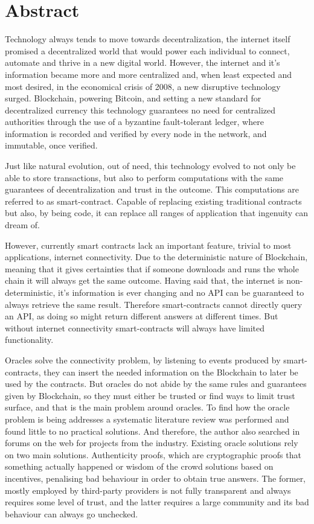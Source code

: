 \chapter*{Abstract}


Technology always tends to move towards decentralization, the internet itself promised a decentralized world that would power each individual to connect, automate and thrive in a new digital world. However, the internet and it's information became more and more centralized and, when least expected and most desired, in the economical crisis of 2008, a new disruptive technology surged. Blockchain, powering Bitcoin, and setting a new standard for decentralized currency this technology guarantees no need for centralized authorities through the use of a byzantine fault-tolerant ledger, where information is recorded and verified by every node in the network, and immutable, once verified.

Just like natural evolution, out of need, this technology evolved to not only be able to store transactions, but also to perform computations with the same guarantees of decentralization and trust in the outcome. This computations are referred to as smart-contract. Capable of replacing existing traditional contracts but also, by being code, it can replace all ranges of application that ingenuity can dream of.

However, currently smart contracts lack an important feature, trivial to most applications, internet connectivity. Due to the deterministic nature of Blockchain, meaning that it gives certainties that if someone downloads and runs the whole chain it will always get the same outcome. Having said that, the internet is non-deterministic, it's information is ever changing and no API can be guaranteed to always retrieve the same result. Therefore smart-contracts cannot directly query an API, as doing so might return different answers at different times. But without internet connectivity smart-contracts will always have limited functionality.

Oracles solve the connectivity problem, by listening to events produced by smart-contracts, they can insert the needed information on the Blockchain to later be used by the contracts. But oracles do not abide by the same rules and guarantees given by Blockchain, so they must either be trusted or find ways to limit trust surface, and that is the main problem around oracles. To find how the oracle problem is being addresses a systematic literature review was performed and found little to no practical solutions. And therefore, the author also searched in forums on the web for projects from the industry. Existing oracle solutions rely on two main solutions. Authenticity proofs, which are cryptographic proofs that something actually happened or wisdom of the crowd solutions based on incentives, penalising bad behaviour in order to obtain true answers. The former, mostly employed by third-party providers is not fully transparent and always requires some level of trust, and the latter requires a large community and its bad behaviour can always go unchecked.

